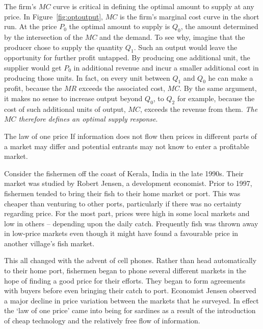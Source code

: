 The firm's $MC$ curve is critical in defining the optimal amount to supply at any price. In Figure~\ref{fig:optoutput}, $MC$ is the firm's marginal cost curve in the short run. At the price $P_0$ the optimal amount to supply is $Q_0$, the amount determined by the intersection of the $MC$ and the demand. To see why, imagine that the producer chose to supply the quantity $Q_1$. Such an output would leave the opportunity for further profit untapped. By producing one additional unit, the supplier would get $P_0$ in additional revenue and incur a smaller additional cost in producing those units. In fact, on every unit between $Q_1$ and $Q_0$ he can make a profit, because the $MR$ exceeds the associated cost, $MC$. By the same argument, it makes no sense to increase output beyond $Q_0$, to $Q_2$ for example, because the cost of such additional units of output, $MC$, exceeds the revenue from them. \textit{The $MC$ therefore defines an optimal supply response}.

\begin{ApplicationBox}{The law of one price \label{app:lawoneprice}}
If information does not flow then prices in different parts of a market may differ and potential entrants may not know to enter a profitable market.

\bigskip
Consider the fishermen off the coast of Kerala, India in the late 1990s. Their market was studied by Robert Jensen, a development economist. Prior to 1997, fishermen tended to bring their fish to their home market or port. This was cheaper than venturing to other ports, particularly if there was no certainty regarding price. For the most part, prices were high in some local markets and low in others -- depending upon the daily catch. Frequently fish was thrown away in low-price markets even though it might have found a favourable price in another village's fish market.

\bigskip
This all changed with the advent of cell phones. Rather than head automatically to their home port, fishermen began to phone several different markets in the hope of finding a good price for their efforts. They began to form agreements with buyers before even bringing their catch to port. Economist Jensen observed a major decline in price variation between the markets that he surveyed. In effect the `law of one price' came into being for sardines as a result of the introduction of cheap technology and the relatively free flow of information. 
\end{ApplicationBox}

